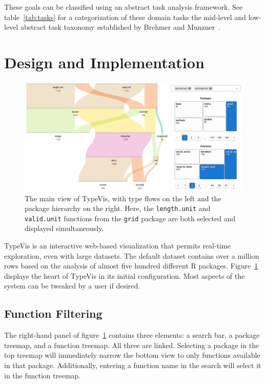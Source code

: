 \documentclass{vgtc}                          %
\newcommand{\typevis}{{\sc TypeVis}\xspace}
\begin{document}
These goals can be classified using an abstract task analysis framework.
See table~\ref{tab:tasks} for a categorization of these domain tasks
the mid-level and low-level abstract task taxonomy
established by Brehmer and Munzner~\cite{brehmer:2013}.


\section{Design and Implementation}

\begin{figure}
 \centering
 \includegraphics[width=\linewidth]{img/typevis.png}
 \caption{The main view of \typevis, with type flows on the left and the package hierarchy on the right. Here, the {\tt length.unit} and {\tt valid.unit} functions from the {\tt grid} package are both selected and displayed simultaneously.}
 \label{fig:typevis}
\end{figure}

\typevis is an interactive web-based visualization
that permits real-time exploration,
even with large datasets.
The default dataset contains over a million rows
based on the analysis of almost five hundred
different R packages.
Figure~\ref{fig:typevis} displays
the heart of \typevis
in its initial configuration.
Most aspects of the system can be tweaked
by a user if desired.

\subsection{Function Filtering}

The right-hand panel of figure~\ref{fig:typevis}
contains three elements: a search bar,
a package treemap,
and a function treemap.
All three are linked.
Selecting a package
in the top treemap will immediately narrow the
bottom view to only functions available in that package.
Additionally, entering a function name in the search
will select it in the function treemap.
\end{document}

